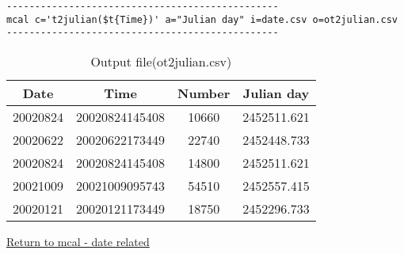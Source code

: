 \begin{verbatim}
------------------------------------------------
mcal c='t2julian($t{Time})' a="Julian day" i=date.csv o=ot2julian.csv
------------------------------------------------
\end{verbatim}

\begin{table}[hbt]
\begin{center}
 \caption{Output file(ot2julian.csv)}
  \begin{tabular}{|c|c|c|c|} \hline
Date&Time&Number&Julian day\\ \hline\hline
20020824&20020824145408&10660&2452511.621\\ \hline
20020622&20020622173449&22740&2452448.733\\ \hline
20020824&20020824145408&14800&2452511.621\\ \hline
20021009&20021009095743&54510&2452557.415\\ \hline
20020121&20020121173449&18750&2452296.733\\ \hline
  \end{tabular}
  \end{center}
\end{table}

\href{run:hizuke.pdf}{Return to mcal - date related }\\
%

